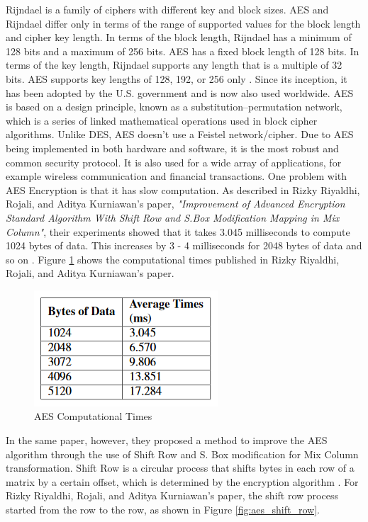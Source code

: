 \documentclass[journal]{IEEEtran}
\begin{document}
\bigskip
Rijndael is a family of ciphers with different key and block sizes. AES and Rijndael differ only in terms of the range of supported values for the block length and cipher key length. In terms of the block length, Rijndael has a minimum of 128 bits and a maximum of 256 bits. AES has a fixed block length of 128 bits. In terms of the key length, Rijndael supports any length that is a multiple of 32 bits. AES supports key lengths of 128, 192, or 256 only \cite{aes_rijndael_length}. Since its inception, it has been adopted by the U.S. government and is now also used worldwide. AES is based on a design principle, known as a substitution–permutation network, which is a series of linked mathematical operations used in block cipher algorithms. Unlike DES, AES doesn't use a Feistel network/cipher. Due to AES being implemented in both hardware and software, it is the most robust and common security protocol. It is also used for a wide array of applications, for example wireless communication and financial transactions. One problem with AES Encryption is that it has slow computation. As described in Rizky Riyaldhi, Rojali, and Aditya Kurniawan's paper, \textit{"Improvement of Advanced Encryption Standard Algorithm With Shift Row and S.Box Modification Mapping in Mix Column"}, their experiments showed that it takes 3.045 milliseconds to compute 1024 bytes of data. This increases by 3 - 4 milliseconds for 2048 bytes of data and so on \cite{aes_improvement}. Figure \ref{fig:aes_initial_times} shows the computational times published in Rizky Riyaldhi, Rojali, and Aditya Kurniawan's paper.

\newline
\begin{figure}[!h]
    \centering
    \includegraphics[scale=.7]{aes_times}
    \caption{AES Computational Times}
    \label{fig:aes_initial_times}
\end{figure}

In the same paper, however, they proposed a method to improve the AES algorithm through the use of Shift Row and S. Box modification for Mix Column transformation. Shift Row is a circular process that shifts bytes in each row of a matrix by a certain offset, which is determined by the encryption algorithm \cite{shift_row}. For Rizky Riyaldhi, Rojali, and Aditya Kurniawan's paper, the shift row process started from the  row to the  row, as shown in Figure \ref{fig:aes_shift_row}.
\end{document}
